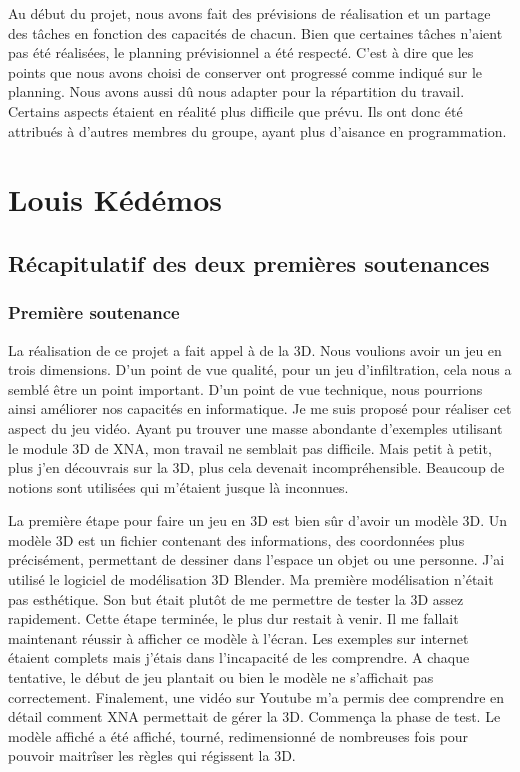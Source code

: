 \documentclass[12pt]{article}
\begin{document}
Au début du projet, nous avons fait des prévisions de réalisation et un partage des tâches en fonction des capacités de chacun. Bien que certaines tâches n'aient pas été réalisées, le planning prévisionnel a été respecté. C'est à dire que les points que nous avons choisi de conserver ont progressé comme indiqué sur le planning. Nous avons aussi dû nous adapter pour la répartition du travail. Certains aspects étaient en réalité plus difficile que prévu. Ils ont donc été attribués à d'autres membres du groupe, ayant plus d'aisance en programmation. 
\newpage

\section{Louis Kédémos}

\subsection{Récapitulatif des deux premières soutenances}

\subsubsection{Première soutenance}

La réalisation de ce projet a fait appel à de la 3D. Nous voulions avoir un jeu en trois dimensions. D'un point de vue qualité, pour un jeu d'infiltration, cela nous a semblé être un point important. D'un point de vue technique, nous pourrions ainsi améliorer nos capacités en informatique. Je me suis proposé pour réaliser cet aspect du jeu vidéo. Ayant pu trouver une masse abondante d'exemples utilisant le module 3D de XNA, mon travail ne semblait pas difficile. Mais petit à petit, plus j'en découvrais sur la 3D, plus cela devenait incompréhensible. Beaucoup de notions sont utilisées qui m'étaient jusque là inconnues. 

La première étape pour faire un jeu en 3D est bien sûr d'avoir un modèle 3D. Un modèle 3D est un fichier contenant des informations, des coordonnées plus précisément, permettant de dessiner dans l'espace un objet ou une personne. J'ai utilisé le logiciel de modélisation 3D Blender. Ma première modélisation n'était pas esthétique. Son but était plutôt de me permettre de tester la 3D assez rapidement. Cette étape terminée, le plus dur restait à venir. Il me fallait maintenant réussir à afficher ce modèle à l'écran. Les exemples sur internet étaient complets mais j'étais dans l'incapacité de les comprendre. A chaque tentative, le début de jeu plantait ou bien le modèle ne s'affichait pas correctement. Finalement, une vidéo sur Youtube m'a permis dee comprendre en détail comment XNA permettait de gérer la 3D. Commença la phase de test. Le modèle affiché a été affiché, tourné, redimensionné de nombreuses fois pour pouvoir maitrîser les règles qui régissent la 3D. 
\end{document}
